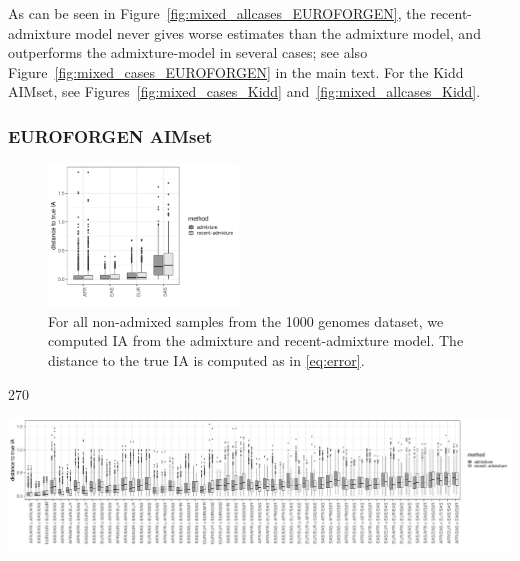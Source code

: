 \documentclass[12pt]{article}
\theoremstyle{definition}
\begin{document}
As can be seen in Figure~\ref{fig:mixed_allcases_EUROFORGEN}, the
recent-admixture model never gives worse estimates than the admixture
model, and outperforms the admixture-model in several cases; see also
Figure~\ref{fig:mixed_cases_EUROFORGEN} in the main text.  For the
Kidd AIMset, see Figures~\ref{fig:mixed_cases_Kidd}
and~\ref{fig:mixed_allcases_Kidd}.

\subsubsection*{EUROFORGEN AIMset}

\begin{figure}[H]
  \begin{center}
    \includegraphics[width=0.45\textwidth]{deviations_nonmixed_EUROFORGEN.pdf}
  \end{center}
  \caption{\label{fig:nonmixed_EUROFORGEN} For all non-admixed samples
    from the 1000 genomes dataset, we computed IA from the admixture
    and recent-admixture model. The distance to the true IA is
    computed as in \eqref{eq:error}.}
\end{figure}

\begin{center}
  \begin{turn}{270}%
    \begin{minipage}{\textheight}
      \includegraphics[width=\textwidth]{deviations_mixed_allcases_EUROFORGEN.pdf}
      \label{fig:mixed_allcases_EUROFORGEN}
    \end{minipage}
  \end{turn}  
\end{center}
       
\end{document}
